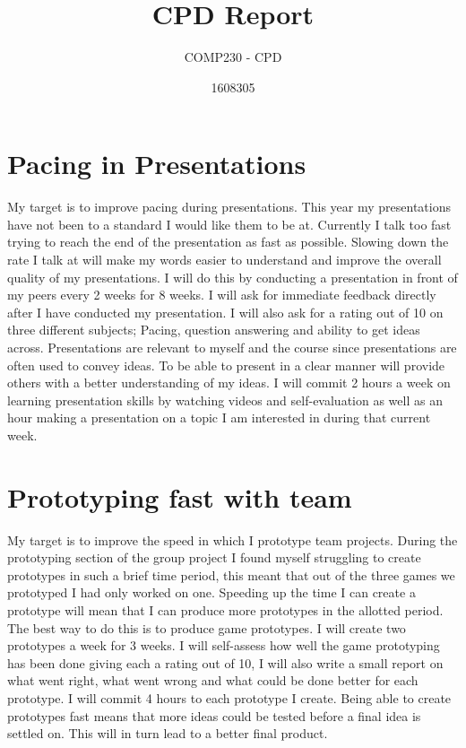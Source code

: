 \documentclass{scrartcl}
\title{CPD Report}
\subtitle{COMP230 - CPD}
\author{1608305}
\begin{document}
\maketitle

\section{Pacing in Presentations}
My target is to improve pacing during presentations. This year my presentations have not been to a standard I would like them to be at. Currently I talk too fast trying to reach the end of the presentation as fast as possible. Slowing down the rate I talk at will make my words easier to understand and improve the overall quality of my presentations.  
\newline
\newline
I will do this by conducting a presentation in front of my peers every 2 weeks for 8 weeks. I will ask for immediate feedback directly after I have conducted my presentation. I will also ask for a rating out of 10 on three different subjects; Pacing, question answering and ability to get ideas across. 
\newline
\newline
Presentations are relevant to myself and the course since presentations are often used to convey ideas. To be able to present in a clear manner will provide others with a better understanding of my ideas.
\newline
\newline
I will commit 2 hours a week on learning presentation skills by watching videos and self-evaluation as well as an hour making a presentation on a topic I am interested in during that current week.

\section{Prototyping fast with team}
My target is to improve the speed in which I prototype team projects. During the prototyping section of the group project I found myself struggling to create prototypes in such a brief time period, this meant that out of the three games we prototyped I had only worked on one. Speeding up the time I can create a prototype will mean that I can produce more prototypes in the allotted period.
\newline
\newline
The best way to do this is to produce game prototypes. I will create two prototypes a week for 3 weeks. I will self-assess how well the game prototyping has been done giving each a rating out of 10, I will also write a small report on what went right, what went wrong and what could be done better for each prototype. I will commit 4 hours to each prototype I create.
\newline
\newline
Being able to create prototypes fast means that more ideas could be tested before a final idea is settled on. This will in turn lead to a better final product.
\end{document}
